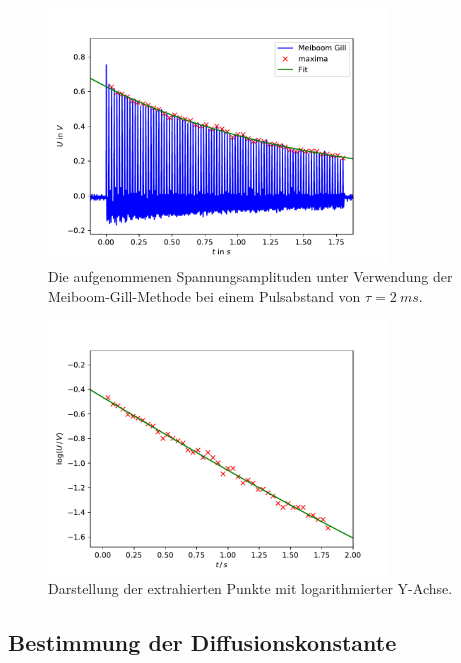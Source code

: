 \begin{figure}
  \centering
  \includegraphics[width=0.8\textwidth]{Plots2/T2.pdf}
  \caption{Die aufgenommenen Spannungsamplituden unter Verwendung der
  Meiboom-Gill-Methode bei einem Pulsabstand von $\tau = \SI{2}{ms}$.}
  \label{fig:T2}
\end{figure}
\begin{figure}
  \centering
  \includegraphics[width=0.8\textwidth]{Plots2/T2Log.pdf}
  \caption{Darstellung der extrahierten Punkte mit logarithmierter Y-Achse.}
  \label{fig:T2Log}
\end{figure}



\newpage
\subsection{Bestimmung der Diffusionskonstante}

